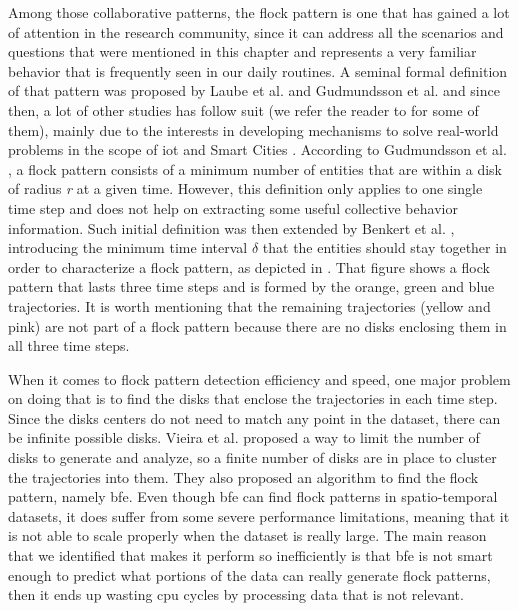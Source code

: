 Among those collaborative patterns, the flock pattern is one that has gained a lot of attention in the research
community, since it can address all the scenarios and questions that were mentioned in this chapter and represents a
very familiar behavior that is frequently seen in our daily routines. A seminal formal definition of that pattern was
proposed by Laube et al. \citep{remo} and Gudmundsson et al. \citep{gudefficient} and since then, a lot of other studies
has follow suit (we refer the reader to  for some of them), mainly due to the interests in
developing mechanisms to solve real-world problems in the scope of \ac{iot} \citep{iot} and Smart Cities
\citep{smartcities}. According to Gudmundsson et al. \citep{gudefficient}, a flock pattern consists of a minimum number
of entities that are within a disk of radius \textit{r} at a given time. However, this definition only applies to one
single time step and does not help on extracting some useful collective behavior information. Such initial definition
was then extended by Benkert et al. \citep{gudreportingflock}, introducing the minimum time interval $\delta$ that the
entities should stay together in order to characterize a flock pattern, as depicted in . That figure
shows a flock pattern that lasts three time steps and is formed by the orange, green and blue trajectories. It is worth
mentioning that the remaining trajectories (yellow and pink) are not part of a flock pattern because there are no disks
enclosing them in all three time steps.

When it comes to flock pattern detection efficiency and speed, one major problem on doing that is to find the disks that
enclose the trajectories in each time step. Since the disks centers do not need to match any point in the dataset, there
can be infinite possible disks. Vieira et al. \citep{vieira} proposed a way to limit the number of disks to generate and
analyze, so a finite number of disks are in place to cluster the trajectories into them. They also proposed an algorithm
to find the flock pattern, namely \ac{bfe}. Even though \ac{bfe} can find flock patterns in spatio-temporal datasets, it
does suffer from some severe performance limitations, meaning that it is not able to scale properly when the dataset is
really large. The main reason that we identified that makes it perform so inefficiently is that \ac{bfe} is not smart
enough to predict what portions of the data can really generate flock patterns, then it ends up wasting \ac{cpu} cycles
by processing data that is not relevant.

